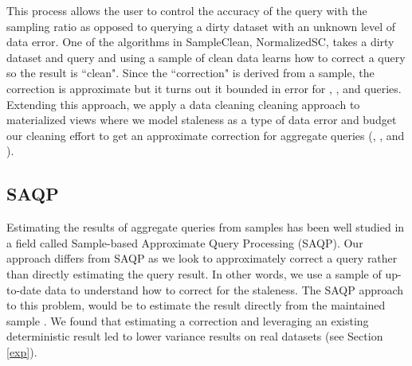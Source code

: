 This process allows the user to control the accuracy of the query with the sampling ratio as opposed to querying a dirty dataset with an unknown level of data error.
One of the algorithms in SampleClean, NormalizedSC, takes a dirty dataset and query and using a sample of clean data learns how
to correct a query so the result is ``clean".
Since the ``correction" is derived from a sample, the correction is approximate but it turns out it bounded in error for  \sumfunc, \countfunc, and \avgfunc queries.
Extending this approach, we apply a data cleaning cleaning approach to materialized views where we model staleness as a type of data error and budget our cleaning effort to get an approximate correction for aggregate queries (\sumfunc, \countfunc, and \avgfunc). 

\subsection{SAQP}
Estimating the results of aggregate queries from samples has been
well studied in a field called Sample-based Approximate Query Processing
(SAQP). 
Our approach differs from SAQP as we look to
approximately correct a query rather than directly estimating the query result.
In other words, we use a sample of up-to-date data to understand how to correct for the
staleness. 
The SAQP approach to this problem, would be to
estimate the result directly from the maintained sample \cite{joshi2008materialized}.
We found that estimating
a correction and leveraging an existing deterministic result led
to lower variance results on real datasets (see Section \ref{exp}). 


